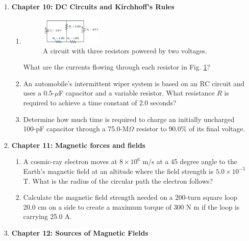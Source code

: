 \documentclass[10pt]{article}
\begin{document}
\begin{enumerate}
\item \textbf{Chapter 10: DC Circuits and Kirchhoff's Rules}
\begin{enumerate}
\item 
\begin{figure}[ht]
\centering
\includegraphics[width=0.3\textwidth]{circuit1.png}
\caption{\label{fig:circuit1} A circuit with three resistors powered by two voltages.}
\end{figure}
What are the currents flowing through each resistor in Fig. \ref{fig:circuit1}? \\ \vspace{16cm}
\item  An automobile’s intermittent wiper system is based on an RC circuit and uses a 0.5-$\mu$F capacitor and a variable resistor. What resistance $R$ is required to achieve a time constant of 2.0 seconds? \\ \vspace{2cm}
\item Determine how much time is required to charge an initially uncharged 100-pF capacitor through a 75.0-M$\Omega$ resistor to 90.0\% of its final voltage. \\ \vspace{2.5cm}
\end{enumerate}
\item \textbf{Chapter 11: Magnetic forces and fields}
\begin{enumerate}
\item A cosmic-ray electron moves at $8 \times 10^6$ m/s at a 45 degree angle to the Earth’s magnetic field at an altitude where the field strength is $5.0 \times 10^{-5}$ T. What is the radius of the circular path the electron follows? \\ \vspace{1.5 cm}
\item Calculate the magnetic field strength needed on a 200-turn square loop 20.0 cm on a side to create a maximum torque of 300 N m if the loop is carrying 25.0 A. \\ \vspace{2cm}
\end{enumerate}
\item \textbf{Chapter 12: Sources of Magnetic Fields}

\end{enumerate}
\end{document}
